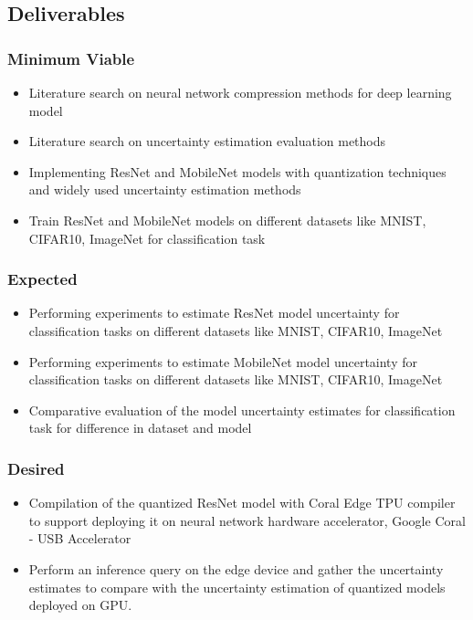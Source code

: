 \documentclass[rnd]{mas_proposal}
\begin{document}
\subsection{Deliverables}

\subsubsection*{Minimum Viable}
\begin{itemize}
    \item Literature search on neural network compression methods for deep learning model
    \item Literature search on uncertainty estimation evaluation methods
    \item Implementing ResNet and MobileNet models with quantization techniques and widely used uncertainty estimation methods
    \item Train ResNet and MobileNet models on different datasets like MNIST, CIFAR10, ImageNet for classification task
\end{itemize}

\subsubsection*{Expected}
\begin{itemize}
    \item Performing experiments to estimate ResNet model uncertainty for classification tasks on different datasets like MNIST, CIFAR10, ImageNet
    \item Performing experiments to estimate MobileNet model uncertainty for classification tasks on different datasets like MNIST, CIFAR10, ImageNet
    \item Comparative evaluation of the model uncertainty estimates for classification task for difference in dataset and model
    \end{itemize}

\subsubsection*{Desired}
\begin{itemize}
    \item Compilation of the quantized ResNet model with Coral Edge TPU compiler to support deploying it on neural network hardware accelerator, Google Coral - USB Accelerator
    \item Perform an inference query on the edge device and gather the uncertainty estimates to compare with the uncertainty estimation of quantized models deployed on GPU.
\end{itemize}

\nocite{*}
 

\end{document}
